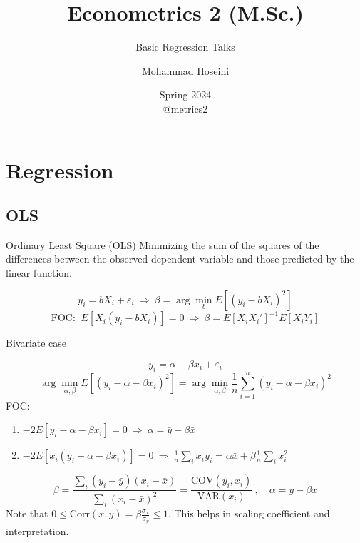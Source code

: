 \documentclass{beamer}
\begin{document}
	\title[Econometrics 2]{Econometrics 2 (M.Sc.)}
	\subtitle{Basic Regression Talks}
	\author[Mohammad Hoseini]{Mohammad Hoseini}
	
	
	\date[Spring 2024]{Spring 2024 \\
	\vspace{10pt} @metrics2
}

	
\begin{frame}[plain]
	\titlepage
\end{frame}

\section{Regression}
\subsection{OLS}
\begin{frame}{Ordinary Least Square (OLS)}
Minimizing the sum of the squares of the differences between the observed dependent variable and those predicted by the linear function.

\[y_i=bX_i+\varepsilon_i \ \Rightarrow \ \beta=\arg\min_b E[(y_i-bX_i)^2] \]
\[\text{FOC: }\ E[X_i(y_i-bX_i)]=0 \ \Rightarrow \ \beta=E[X_iX_i']^{-1}E[X_iY_i] \]


\end{frame}




\begin{frame}{Bivariate case}

\[y_i=\alpha+\beta x_i+\varepsilon_i\]
\[\arg\min_{\alpha,\beta} E[(y_i-\alpha-\beta x_i)^2] =\arg\min_{\alpha,\beta} \frac{1}{n}\sum_{i=1}^n(y_i-\alpha-\beta x_i)^2 \]\pause
FOC: 
\begin{enumerate}
\item $-2E[y_i-\alpha-\beta x_i]=0\ \Rightarrow \ \alpha=\bar{y}-\beta \bar{x} $
\item $-2E[x_i(y_i-\alpha-\beta x_i)]=0\ \Rightarrow \ \frac{1}{n}\sum_i x_iy_i =\alpha\bar{x}+\beta\frac{1}{n}\sum_i x_i^2 $
\end{enumerate} 

\[\beta=\frac{\sum_i(y_i-\bar{y})(x_i-\bar{x})}{\sum_i(x_i-\bar{x})^2}=\frac{\text{COV}(y_i,x_i)}{\text{VAR}(x_i)} \ ,\quad \alpha=\bar{y}-\beta\bar{x} \]
Note that $0\le \text{Corr}(x,y)=\beta\frac{\sigma_x}{\sigma_y}\le1$. This helps in scaling coefficient and interpretation. 

\end{frame}
\end{document}
